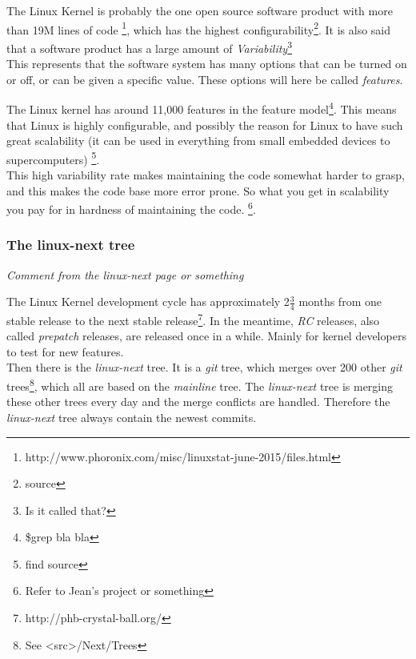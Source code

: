 \documentclass[a4paper,11pt]{article}
\begin{document}
The Linux Kernel is probably the one open source software product with more 
than 19M lines of code 
\footnote{http://www.phoronix.com/misc/linuxstat-june-2015/files.html}, 
which has the highest configurability\footnote{source}. It is also said that a 
software product has a large amount of \emph{Variability}\footnote{Is it 
called that?} \\


This represents that the software system has many options that can be turned 
on or off, or can be given a specific value. These options will here be called 
\emph{features}.

The Linux kernel has around 11,000 features in the feature 
model\footnote{\$grep bla bla}. This means that Linux is highly configurable, 
and possibly the reason for Linux to have such great scalability (it can be 
used in everything from small embedded devices to supercomputers) 
\footnote{find source}. \\


This high variability rate makes maintaining the code somewhat harder to 
grasp, and this makes the code base more error prone. So what you get in 
scalability you pay for in hardness of maintaining the code. \footnote{Refer 
to Jean's project or something}.


\subsubsection{The linux-next tree}

\begin{center}
    \emph{
        Comment from the linux-next page or something
    }
\end{center}

The Linux Kernel development cycle has approximately 2$\frac{3}{4}$ months 
from one stable release to the next stable 
release\footnote{http://phb-crystal-ball.org/}. In the meantime, \emph{RC} 
releases, also called \emph{prepatch} releases, are released once in a while. 
Mainly for kernel developers to test for new features.  \\


Then there is the \emph{linux-next} tree. It is a \emph{git} tree, which 
merges over 200 other \emph{git} trees\footnote{See <src>/Next/Trees}, which 
all are based on the \emph{mainline} tree. The \emph{linux-next} tree is 
merging these other trees every day and the merge conflicts are handled. 
Therefore the \emph{linux-next} tree always contain the newest commits. 
\end{document}
